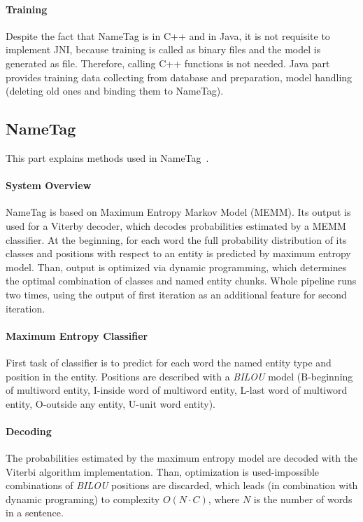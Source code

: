 \paragraph{Training}
Despite the fact that NameTag is in C++ and \textan{} in Java, it is not
requisite to implement JNI, because training is called as binary files and the
model is generated as file. Therefore, calling C++ functions is not needed. Java
part provides training data collecting from database and preparation, model
handling (deleting old ones and binding them to NameTag).

\subsection{NameTag}
This part explains methods used in NameTag~\cite{strakova13, strakova14}.

\paragraph{System Overview}
NameTag is based on Maximum Entropy Markov Model (MEMM). Its output is used for a Viterby decoder, which decodes probabilities estimated by a MEMM classifier.
At the beginning, for each word the full probability distribution of its classes and positions with respect to an entity is predicted by maximum entropy model. Than, output is optimized via dynamic programming, which determines the optimal combination of classes and named entity chunks.
Whole pipeline runs two times, using the output of first iteration as an additional feature for second iteration.

\paragraph{Maximum Entropy Classifier}
First task of classifier is to predict for each word the named entity type and position in the entity. Positions are described with a {\it BILOU} model (B-beginning of multiword entity, I-inside word of multiword entity, L-last word of multiword entity, O-outside any entity, U-unit word entity).

\paragraph{Decoding}
The probabilities estimated by the maximum entropy model are decoded with the Viterbi algorithm implementation. Than, optimization is used-impossible combinations of {\it BILOU} positions are discarded, which leads (in combination with dynamic programing) to complexity  \(O(N \cdot C)\), where \(N\) is the number of words in a sentence.

